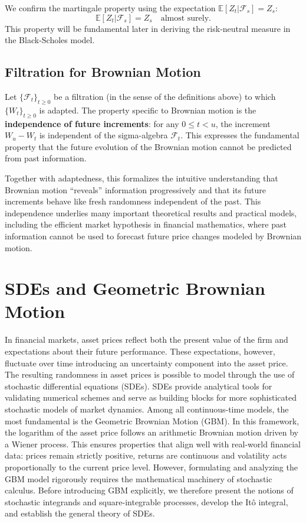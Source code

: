We confirm the martingale property using the expectation $\mathbb{E}[Z_t | \mathcal{F}_s] = Z_s$:
\[
\mathbb{E}[Z_t | \mathcal{F}_s] = Z_s \quad \text{almost surely}.
\]
This property will be fundamental later in deriving the risk-neutral measure in the Black-Scholes model.
\subsection{Filtration for Brownian Motion}

Let $\{\mathcal{F}_t\}_{t \ge 0}$ be a filtration (in the sense of the definitions above) to which $\{W_t\}_{t \ge 0}$ is adapted. The property specific to Brownian motion is the \textbf{independence of future increments}: for any $0 \le t < u$, the increment $W_u - W_t$ is independent of the sigma-algebra $\mathcal{F}_t$. This expresses the fundamental property that the future evolution of the Brownian motion cannot be predicted from past information.

Together with adaptedness, this formalizes the intuitive understanding that Brownian motion “reveals” information progressively and that its future increments behave like fresh randomness independent of the past. This independence underlies many important theoretical results and practical models, including the efficient market hypothesis in financial mathematics, where past information cannot be used to forecast future price changes modeled by Brownian motion.

\section{SDEs and Geometric Brownian Motion}
In financial markets, asset prices reflect both the present value of the firm and expectations about their future performance. These expectations, however, fluctuate over time introducing an uncertainty component into the asset price. The resulting randomness in asset prices is possible to model through the use of stochastic differential equations (SDEs).
SDEs provide analytical tools for validating numerical schemes and serve as building blocks for more sophisticated stochastic models of market dynamics.
Among all continuous-time models, the most fundamental is the Geometric Brownian Motion (GBM). In this framework, the logarithm of the asset price follows an arithmetic Brownian motion driven by a Wiener process. This ensures properties that align well with real-world financial data: prices remain strictly positive, returns are continuous and volatility acts proportionally to the current price level.
However, formulating and analyzing the GBM model rigorously requires the mathematical machinery of stochastic calculus. Before introducing GBM explicitly, we therefore present the notions of stochastic integrands and square-integrable processes, develop the Itô integral, and establish the general theory of SDEs.
